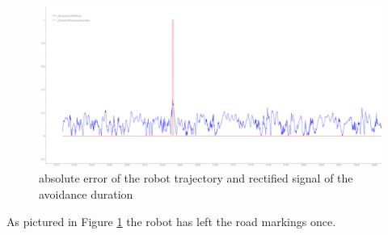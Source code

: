 \begin{figure}[H]
	\includegraphics[width=\textwidth]{Pictures/final analysis no obstacle}
	\caption{absolute error of the robot trajectory and rectified signal of the avoidance duration}
	\label{noobserr}
\end{figure}

As pictured in Figure \ref{noobserr} the robot has left the road markings once.\\

